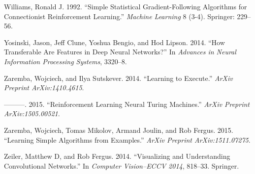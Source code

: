 \documentclass[12pt,twoside]{mitthesis}
\begin{document}
\hypertarget{ref-williams1992simple}{}
Williams, Ronald J. 1992. ``Simple Statistical Gradient-Following
Algorithms for Connectionist Reinforcement Learning.'' \emph{Machine
Learning} 8 (3-4). Springer: 229--56.

\hypertarget{ref-yosinski2014transferable}{}
Yosinski, Jason, Jeff Clune, Yoshua Bengio, and Hod Lipson. 2014. ``How
Transferable Are Features in Deep Neural Networks?'' In \emph{Advances
in Neural Information Processing Systems}, 3320--8.

\hypertarget{ref-zaremba2014learning}{}
Zaremba, Wojciech, and Ilya Sutskever. 2014. ``Learning to Execute.''
\emph{ArXiv Preprint ArXiv:1410.4615}.

\hypertarget{ref-zaremba2015reinforcement}{}
---------. 2015. ``Reinforcement Learning Neural Turing Machines.''
\emph{ArXiv Preprint ArXiv:1505.00521}.

\hypertarget{ref-zaremba2015learning}{}
Zaremba, Wojciech, Tomas Mikolov, Armand Joulin, and Rob Fergus. 2015.
``Learning Simple Algorithms from Examples.'' \emph{ArXiv Preprint
ArXiv:1511.07275}.

\hypertarget{ref-zeiler2014visualizing}{}
Zeiler, Matthew D, and Rob Fergus. 2014. ``Visualizing and Understanding
Convolutional Networks.'' In \emph{Computer Vision--ECCV 2014}, 818--33.
Springer.

\begin{singlespace}

\end{singlespace}

% 
% 
% 
% 
% 
% 
\end{document}
